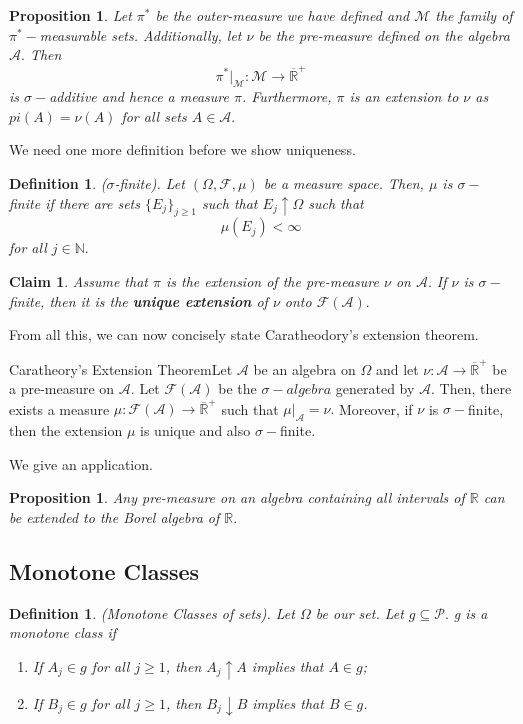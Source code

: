 \documentclass[twoside]{article}
\newtheorem{proposition}[theorem]{Proposition}
\newtheorem{claim}[theorem]{Claim}
\newtheorem{definition}[theorem]{Definition}
\newcommand{\algebra}{\mathcal{A}}
\newcommand{\sigmalgebra}{\mathcal{F}}
\newcommand{\sa}{\sigma-algebra}
\newcommand{\powerset}{\mathcal{P}}
\newcommand{\positiveextendedreal}{\overline{\mathbb{R}}^+}
\begin{document}
\begin{proposition}Let $\pi^*$ be the outer-measure we have defined and $\mathcal{M}$ the family of $\pi^*-$measurable sets. Additionally, let $\nu$ be the pre-measure defined on the algebra $\algebra.$ Then 
$$
\pi^*|_{\mathcal{M}}: \mathcal{M} \rightarrow \positiveextendedreal
$$
is $\sigma-$additive and hence a measure $\pi$. Furthermore, $\pi$ is an extension to $\nu$ as $pi(A) = \nu(A)$ for all sets $A \in \algebra.$
\end{proposition}

We need one more definition before we show uniqueness.
\begin{definition}($\sigma$-finite). Let $(\Omega, \mathcal{F}, \mu)$ be a measure space. Then, $\mu$ is $\sigma-$finite if there are sets $\{E_j\}_{j \geq 1}$ such that $E_j \uparrow \Omega$ such that 
$$
\mu(E_j) < \infty
$$
for all $j \in \mathbb{N}.$
\end{definition}

\begin{claim}Assume that $\pi$ is the extension of the pre-measure $\nu$ on $\algebra.$ If $\nu$ is $\sigma-$finite, then it is the \textbf{unique extension} of $\nu$ onto $\sigmalgebra(\algebra).$
\end{claim}

From all this, we can now concisely state Caratheodory's extension theorem.

\begin{theorem_exam}{Caratheory's Extension Theorem}{}Let $\algebra$ be an algebra on $\Omega$ and let $\nu: \algebra \rightarrow \positiveextendedreal$ be a pre-measure on $\algebra.$ Let $\sigmalgebra(\algebra)$ be the $\sa$ generated by $\algebra.$ Then, there exists a measure $\mu: \sigmalgebra(\algebra) \rightarrow \positiveextendedreal$ such that $\mu|_{\algebra} = \nu.$ Moreover, if $\nu$ is $\sigma-$finite, then the extension $\mu$ is unique and also $\sigma-$finite.
\end{theorem_exam}

We give an application.
\begin{proposition}Any pre-measure on an algebra containing all intervals of $\mathbb{R}$ can be extended to the Borel algebra of $\mathbb{R}.$
\end{proposition}

\subsection{Monotone Classes}
\begin{definition}(Monotone Classes of sets). Let $\Omega$ be our set. Let $g \subseteq \powerset.$ g is a monotone class if 
\begin{enumerate}
\item If $A_j \in g$ for all $j \geq 1$, then $A_j \uparrow A$ implies that $A \in g$;
\item If $B_j \in g$ for all $j \geq 1$, then $B_j \downarrow B$ implies that $B \in g$.
\end{enumerate}
\end{definition}
\end{document}
